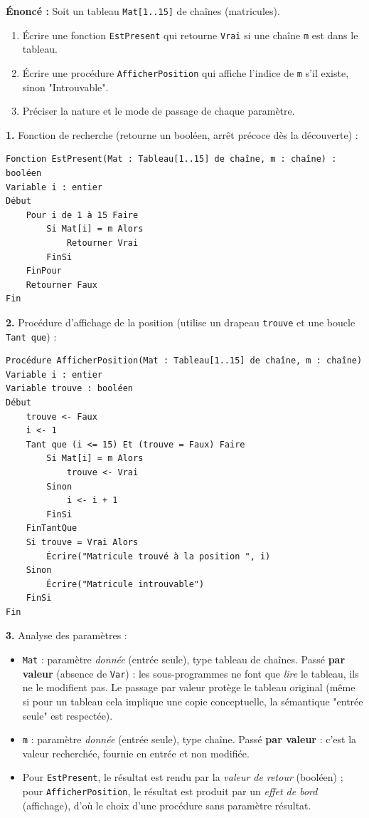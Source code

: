 \documentclass[11pt]{article}
\begin{document}
\begin{corrige}
\textbf{Énoncé :} Soit un tableau \texttt{Mat[1..15]} de chaînes (matricules).
\begin{enumerate}
  \item Écrire une fonction \texttt{EstPresent} qui retourne \texttt{Vrai} si une chaîne \texttt{m} est dans le tableau.
  \item Écrire une procédure \texttt{AfficherPosition} qui affiche l'indice de \texttt{m} s'il existe, sinon "Introuvable".
  \item Préciser la nature et le mode de passage de chaque paramètre.
\end{enumerate}
\tcblower
\textbf{1.} Fonction de recherche (retourne un booléen, arrêt précoce dès la découverte) :

\begin{lstlisting}
Fonction EstPresent(Mat : Tableau[1..15] de chaîne, m : chaîne) : booléen
Variable i : entier
Début
    Pour i de 1 à 15 Faire
        Si Mat[i] = m Alors
            Retourner Vrai
        FinSi
    FinPour
    Retourner Faux
Fin
\end{lstlisting}

\textbf{2.} Procédure d'affichage de la position (utilise un drapeau \texttt{trouve} et une boucle \texttt{Tant que}) :

\begin{lstlisting}
Procédure AfficherPosition(Mat : Tableau[1..15] de chaîne, m : chaîne)
Variable i : entier
Variable trouve : booléen
Début
    trouve <- Faux
    i <- 1
    Tant que (i <= 15) Et (trouve = Faux) Faire
        Si Mat[i] = m Alors
            trouve <- Vrai
        Sinon
            i <- i + 1
        FinSi
    FinTantQue
    Si trouve = Vrai Alors
        Écrire("Matricule trouvé à la position ", i)
    Sinon
        Écrire("Matricule introuvable")
    FinSi
Fin
\end{lstlisting}

\textbf{3.} Analyse des paramètres :
\begin{itemize}
  \item \texttt{Mat} : paramètre \emph{donnée} (entrée seule), type tableau de chaînes. Passé \textbf{par valeur} (absence de \texttt{Var}) : les sous-programmes ne font que \emph{lire} le tableau, ils ne le modifient pas. Le passage par valeur protège le tableau original (même si pour un tableau cela implique une copie conceptuelle, la sémantique "entrée seule" est respectée).
  \item \texttt{m} : paramètre \emph{donnée} (entrée seule), type chaîne. Passé \textbf{par valeur} : c'est la valeur recherchée, fournie en entrée et non modifiée.
  \item Pour \texttt{EstPresent}, le résultat est rendu par la \emph{valeur de retour} (booléen) ; pour \texttt{AfficherPosition}, le résultat est produit par un \emph{effet de bord} (affichage), d'où le choix d'une procédure sans paramètre résultat.
\end{itemize}
\end{corrige}
\end{document}

